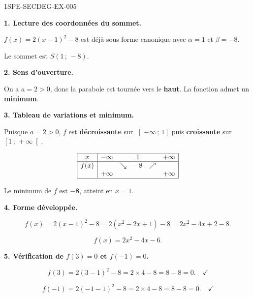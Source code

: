\begin{corrige}{1SPE-SECDEG-EX-005}

\textbf{1. Lecture des coordonnées du sommet.}


$f(x) = 2(x-1)^2 - 8$ est déjà sous forme canonique avec $\alpha = 1$ et $\beta = -8$.

Le sommet est $S(1\,;\,-8)$.

\medskip
\textbf{2. Sens d'ouverture.}


On a $a = 2 > 0$, donc la parabole est tournée vers le \textbf{haut}. La fonction admet un \textbf{minimum}.

\medskip
\textbf{3. Tableau de variations et minimum.}

Puisque $a = 2 > 0$, $f$ est \textbf{décroissante} sur $\left]-\infty\,;\,1\right]$ puis \textbf{croissante} sur $\left[1\,;\,+\infty\right[$.

\[
\begin{array}{|c|ccccc|}
\hline
x & -\infty & & 1 & & +\infty \\
\hline
f(x) & & \searrow & -8 & \nearrow & \\
 & +\infty & & & & +\infty \\
\hline
\end{array}
\]

Le minimum de $f$ est $\mathbf{-8}$, atteint en $x = 1$.

\medskip
\textbf{4. Forme développée.}


\[f(x) = 2(x-1)^2 - 8 = 2(x^2 - 2x + 1) - 8 = 2x^2 - 4x + 2 - 8.\]

\[\boxed{f(x) = 2x^2 - 4x - 6.}\]

\medskip
\textbf{5. Vérification de $f(3) = 0$ et $f(-1) = 0$.}


\[f(3) = 2(3-1)^2 - 8 = 2 \times 4 - 8 = 8 - 8 = 0. \quad \checkmark\]

\[f(-1) = 2(-1-1)^2 - 8 = 2 \times 4 - 8 = 8 - 8 = 0. \quad \checkmark\]

\end{corrige}
